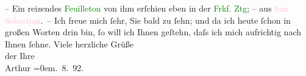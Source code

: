                – Ein reizendes \textcolor{green}{Feuilleton}{} von ihm erſchien eben
               in der \textcolor{green}{Frkf. Ztg}{}\ledrightnote{\textcolor{green}{Frankfurter Zeitung}}; – aus \textcolor{pink}{San Sebastian}{}\ledrightnote{\textcolor{pink}{San Sebastian}}. –\pend
           \pstart
           Ich freue mich ſehr, Sie bald zu ſehn; und da ich heute ſchon in großen Worten drin
               bin, ſo will ich Ihnen geſtehn, daſs ich mich aufrichtig nach Ihnen ſehne.\pend
           \pstart
           {\pb} Viele herzliche Grüße{\\[\baselineskip]}der Ihre{\\[\baselineskip]}\spacefill\mbox{Arthur}\pend
           \leftskip=0em{}. 8. 92.\pend
           \endnumbering{}  
      